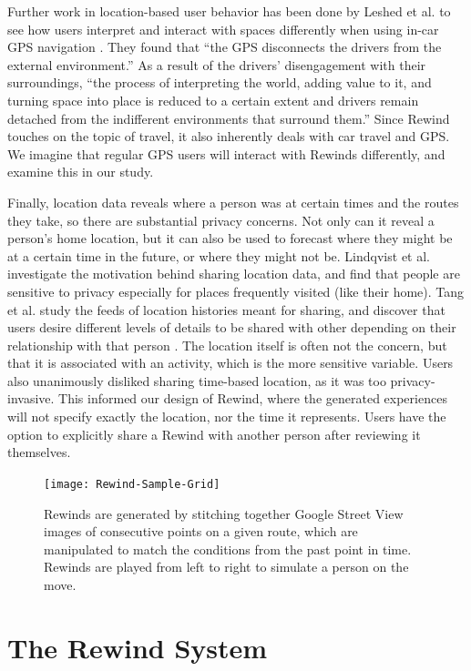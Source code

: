 \documentclass{sigchi}
\begin{document}
Further work in location-based user behavior has been done by Leshed et al. to see how users interpret and interact with spaces differently when using in-car GPS navigation \cite{leshed2008car}. They found that ``the GPS disconnects the drivers from the external environment.'' As a result of the drivers' disengagement with their surroundings, ``the process of interpreting the world, adding value to it, and turning space into place is reduced to a certain extent and drivers remain detached from the indifferent environments that surround them.'' Since Rewind touches on the topic of travel, it also inherently deals with car travel and GPS. We imagine that regular GPS users will interact with Rewinds differently, and examine this in our study.

Finally, location data reveals where a person was at certain times and the routes they take, so there are substantial privacy concerns. Not only can it reveal a person's home location, but it can also be used to forecast where they might be at a certain time in the future, or where they might not be. Lindqvist et al. \cite{lindqvist2011m} investigate the motivation behind sharing location data, and find that people are sensitive to privacy especially for places frequently visited (like their home). Tang et al. study the feeds of location histories meant for sharing, and discover that users desire different levels of details to be shared with other depending on their relationship with that person \cite{tang2011understanding}. The location itself is often not the concern, but that it is associated with an activity, which is the more sensitive variable. Users also unanimously disliked sharing time-based location, as it was too privacy-invasive. This informed our design of Rewind, where the generated experiences will not specify exactly the location, nor the time it represents. Users have the option to explicitly share a Rewind with another person after reviewing it themselves.

\begin{figure}[h]
   \centering
     \texttt{[image: Rewind-Sample-Grid]}
     \caption{Rewinds are generated by stitching together Google Street View images of consecutive points on a given route, which are manipulated to match the conditions from the past point in time. Rewinds are played from left to right to simulate a person on the move.}
     \label{fig:rewinds}
\end{figure}

\section{The Rewind System}
\end{document}
